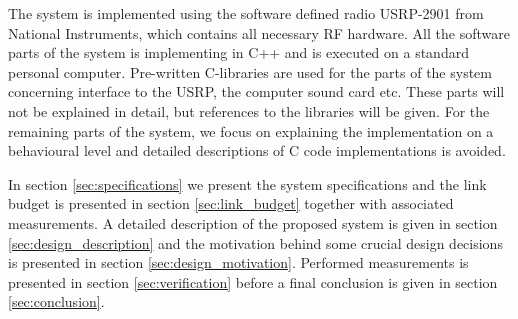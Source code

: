 The system is implemented using the software defined radio USRP-2901\cite{USRP2901} from National Instruments, which contains all necessary RF hardware. All the software parts of the system is implementing in C++ and is executed on a standard personal computer. Pre-written C-libraries are used for the parts of the system concerning interface to the USRP, the computer sound card etc. These parts will not be explained in detail, but references to the libraries will be given. For the remaining parts of the system, we focus on explaining the implementation on a behavioural level and detailed descriptions of C code implementations is avoided. 

In section \ref{sec:specifications} we present the system specifications and the link budget is presented in section \ref{sec:link_budget} together with associated measurements. A detailed description of the proposed system is given in section \ref{sec:design_description} and the motivation behind some crucial design decisions is presented in section \ref{sec:design_motivation}. Performed measurements is presented in section \ref{sec:verification} before a final conclusion is given in section \ref{sec:conclusion}.